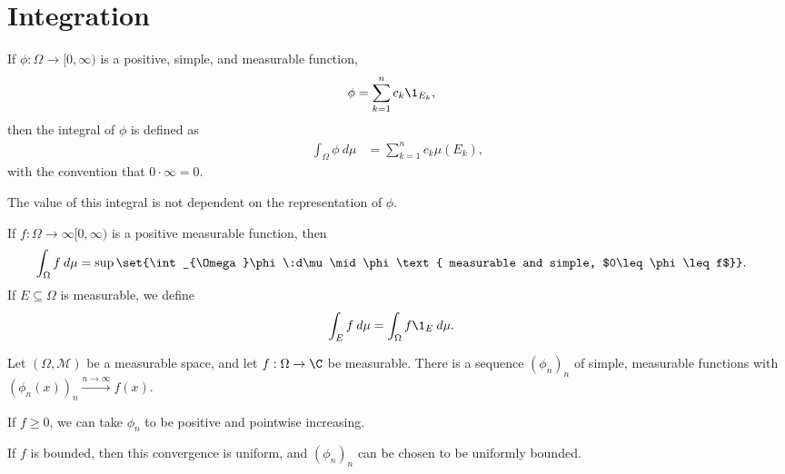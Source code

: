 \section{Integration}%
\begin{definition}
  If $\phi\colon \Omega\rightarrow [0,\infty)$ is a positive, simple, and measurable function, 
  \begin{align*}
    \phi &= \sum_{k=1}^{n}c_k\1_{E_k},
  \end{align*}
  then the integral of $\phi$ is defined as
  \begin{align*}
    \int_{\Omega}\phi\:d\mu &= \sum_{k=1}^{n}c_k\mu\left(E_k\right),
  \end{align*}
  with the convention that $0\cdot \infty = 0$.\newline
   
  The value of this integral is not dependent on the representation of $\phi$.
\end{definition}
\begin{definition}
  If $f\colon \Omega\rightarrow\infty [0,\infty)$ is a positive measurable function, then
  \begin{align*}
    \int_{\Omega}f\:d\mu &= \sup\set{\int_{\Omega}\phi\:d\mu\mid \phi\text{ measurable and simple, $0\leq \phi \leq f$}}.
  \end{align*}
  If $E\subseteq \Omega$ is measurable, we define
  \begin{align*}
    \int_{E} f\:d\mu &= \int_{\Omega}f\1_{E}\:d\mu.
  \end{align*}
\end{definition}
\begin{proposition}
  Let $\left(\Omega,\mathcal{M}\right)$ be a measurable space, and let $f:\Omega\rightarrow \C$ be measurable. There is a sequence $\left(\phi_{n}\right)_n$ of simple, measurable functions with $\left(\phi_{n}\left(x\right)\right)_{n}\xrightarrow{n\rightarrow\infty}f(x)$.\newline

  If $f\geq 0$, we can take $\phi_n$ to be positive and pointwise increasing.\newline

  If $f$ is bounded, then this convergence is uniform, and $\left(\phi_{n}\right)_n$ can be chosen to be uniformly bounded.
\end{proposition}

